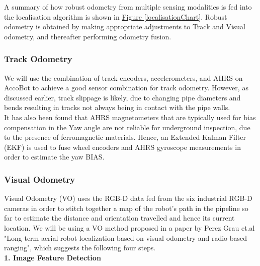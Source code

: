 \documentclass[11pt]{article}		%
\newcommand{\figref}[1]{\hyperref[#1]{Figure \ref*{#1}}}    %
\begin{document}
	\hspace*{3ex}A summary of how robust odometry from multiple sensing modalities is fed into the localisation algorithm is shown in \figref{localisationChart}. Robust odometry is obtained by making appropriate adjustments to Track and Visual odometry, and thereafter performing odometry fusion.
  \subsubsection{Track Odometry}
		We will use the combination of track encoders, accelerometers, and AHRS on AccoBot to achieve a good sensor combination for track odometry. However, as discussed earlier, track slippage is likely, due to changing pipe diameters and bends resulting in tracks not always being in contact with the pipe walls. 
		\\It has also been found that AHRS magnetometers that are typically used for bias compensation in the Yaw angle are not reliable for underground inspection, due to the presence of ferromagnetic materials. Hence, an Extended Kalman Filter (EKF) is used to fuse wheel encoders and AHRS gyroscope measurements in order to estimate the yaw BIAS. 

	\subsubsection{Visual Odometry}
	Visual Odometry (VO) uses the RGB-D data fed from the six industrial RGB-D cameras in order to stitch together a map of the robot's path in the pipeline so far to estimate the distance and orientation travelled and hence its current location. We will be using a VO method proposed in a paper by Perez Grau et.al "Long-term aerial robot localization based on visual odometry and radio-based ranging", which suggests the following four steps.
	\\\textbf{1. Image Feature Detection}
	
\end{document}
